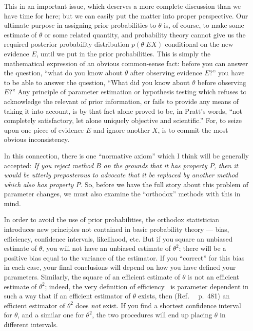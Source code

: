 \documentclass[12pt]{article}
\let\oldcite\cite
\renewcommand{\cite}{~\oldcite}
\begin{document}
This in an important issue, which deserves a more complete discussion
than we have time for here; but we can easily put the matter into proper
perspective. Our ultimate purpose in assigning prior probabilities
to $\theta$ is, of course, to make some estimate of $\theta$ or some related
quantity, and probability theory cannot give us the required posterior
probability distribution $p(\theta|EX)$ conditional on the new evidence $E$,
until we put in the prior probabilities. This is simply the mathematical expression of an obvious common-sense fact: before you can answer the
question, ``what do you know about $\theta$ after observing evidence $E$?'' you
have to be able to answer the question, ``What did you know about $\theta$ before observing $E$?'' Any principle of parameter estimation or
hypothesis testing which refuses to acknowledge the relevant of prior information, or fails to provide any means of taking it into
account, is by that fact alone proved to be, in Pratt's words, ``not
completely satisfactory, let alone uniquely objective and scientific.''
For, to seize upon one piece of evidence $E$ and ignore another $X$, is
to commit the most obvious inconsistency.

In this connection, there is one ``normative axiom'' which I think will be generally accepted: \emph{If you reject method $B$ on the grounds that it has property $P$, then it would be utterly preposterous to advocate that it be replaced by another method which also has property $P$.} So,  before we have the full story about this problem of parameter changes, we must also examine the ``orthodox'' methods with this in mind.

In order to avoid the use of prior probabilities, the orthodox statistician introduces new principles not contained in basic probability theory --- bias, efficiency, confidence intervals, likelihood, etc. But if you square an unbiased estimate of $\theta$, you will not have an unbiased estimate of $\theta^2$; there will be a positive bias equal to the variance of the estimator. If you ``correct'' for this bias in each case, your final conclusions will depend on how you have defined your parameters.
Similarly, the square of an efficient estimate of $\theta$ is not an efficient estimate of $\theta^2$; indeed, the very definition of efficiency\cite{cramer} is parameter dependent in such a way that if an efficient estimator of $\theta$ exists, then (Ref.~\cite{cramer} p.~481) an efficient estimator of $\theta^2$ does \emph{not} exist.
 If you find a shortest confidence interval for $\theta$, and
a similar one for $\theta^2$, the two procedures will end up placing $\theta$ in
different intervals.
\end{document}
